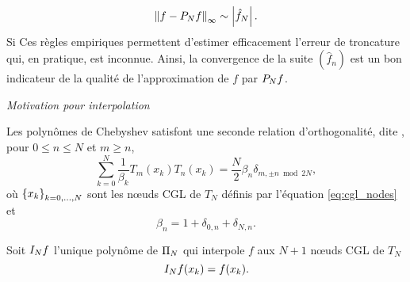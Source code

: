 \begin{equation}
	\norminf{f - \truncseries{f}{N}} \sim \left| \hat{f}_N \right|.
	\label{eq:chebyshev_truncation_error_rule_of_thumb}
\end{equation}
Si 
Ces règles empiriques permettent d'estimer efficacement l'erreur de troncature qui, en pratique, est inconnue.
Ainsi, la convergence de la suite $(\hat{f}_n)$ est un bon indicateur de la qualité de l'approximation de $f$ par $\truncseries{f}{N}$.
\par\bigskip
\textit{Motivation pour interpolation}

Les polynômes de Chebyshev satisfont une seconde relation d'orthogonalité, dite , pour $0 \leq n \leq N$ et $m \geq n$,
\begin{equation}
	\sum_{k=0}^{N} \frac{1}{\beta_k} T_m(x_k) T_n(x_k) = 
	\frac{N}{2} \beta_n \delta_{m,\pm n \bmod{2N}},
	\label{eq:chebyshev_discrete_orthogonality}
\end{equation}
où $\family{x}{k}{0}{N}$ sont les n\oe uds CGL de $T_N$ définis par l'équation \eqref{eq:cgl_nodes} et
\begin{equation}
	\beta_n = 
	1 + \delta_{0,n} + \delta_{N,n}.
\end{equation}

\par


Soit $\interpolant{f}{N}$ l'unique polynôme de $\polyspace{N}$ qui interpole $f$ aux $N+1$ n\oe uds CGL de $T_N$
\begin{equation}
	\interpolant{f}{N}(x_k) = f(x_k).
	\label{eq:chebyshev_interpolation_cgl}
\end{equation}

